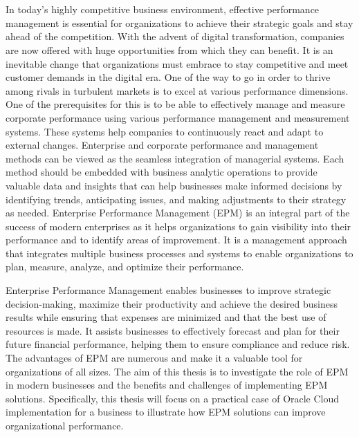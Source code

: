 \documentclass[12pt,a4paper,openright,twoside]{book}
\begin{document}
\mainmatter

\chapter{\introductionname}
\label{chap:introduction}

In today's highly competitive business environment, effective performance management is essential for organizations to achieve their strategic goals and stay ahead of the competition.
%
With the advent of digital transformation, companies are now offered with huge opportunities from which they can benefit.
%
It is an inevitable change that organizations must embrace to stay competitive and meet customer demands in the digital era.
%
One of the way to go in order to thrive among rivals in turbulent markets is to excel at various performance dimensions. 
%
One of the prerequisites for this is to be able to effectively manage and measure corporate performance using various performance management and measurement systems. 
%
These systems help companies to continuously react and adapt to external changes.
%
Enterprise and corporate performance and management methods can be viewed as the seamless integration of managerial systems. 
%
Each method should be embedded with business analytic operations to provide valuable data and insights that can help businesses make informed decisions by identifying trends, anticipating issues, and making adjustments to their strategy as needed.
%
Enterprise Performance Management (EPM) is an integral part of the success of modern enterprises as it helps organizations to gain visibility into their performance and to identify areas of improvement.
%
It is a management approach that integrates multiple business processes and systems to enable organizations to plan, measure, analyze, and optimize their performance.

Enterprise Performance Management enables businesses to improve strategic decision-making, maximize their productivity and achieve the desired business results while ensuring that expenses are minimized and that the best use of resources is made.
%
It assists businesses to effectively forecast and plan for their future financial performance, helping them to ensure compliance and reduce risk. 
%
The advantages of EPM are numerous and make it a valuable tool for organizations of all sizes.
%
The aim of this thesis is to investigate the role of EPM in modern businesses and the benefits and challenges of implementing EPM solutions. 
%
Specifically, this thesis will focus on a practical case of Oracle Cloud implementation for a business to illustrate how EPM solutions can improve organizational performance. 
\end{document}
